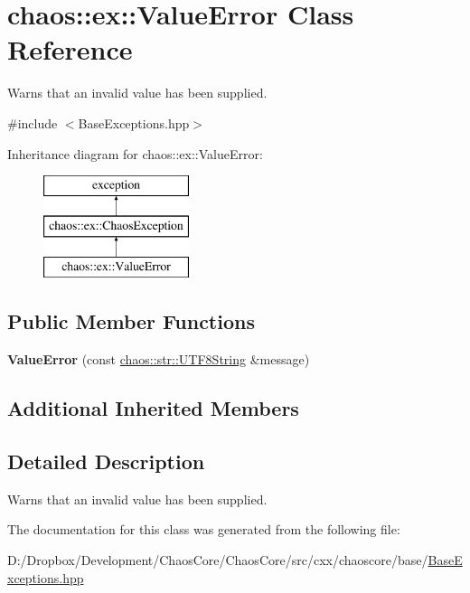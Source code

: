 \hypertarget{classchaos_1_1ex_1_1_value_error}{}\section{chaos\+:\+:ex\+:\+:Value\+Error Class Reference}
\label{classchaos_1_1ex_1_1_value_error}


Warns that an invalid value has been supplied.  




{\ttfamily \#include $<$Base\+Exceptions.\+hpp$>$}

Inheritance diagram for chaos\+:\+:ex\+:\+:Value\+Error\+:\begin{figure}[H]
\begin{center}
\leavevmode
\includegraphics[height=3.000000cm]{classchaos_1_1ex_1_1_value_error}
\end{center}
\end{figure}
\subsection*{Public Member Functions}
\begin{DoxyCompactItemize}
\item 
\hypertarget{classchaos_1_1ex_1_1_value_error_ad7c90b7ae603eec76908add85d311633}{}{\bfseries Value\+Error} (const \hyperlink{classchaos_1_1str_1_1_u_t_f8_string}{chaos\+::str\+::\+U\+T\+F8\+String} \&message)\label{classchaos_1_1ex_1_1_value_error_ad7c90b7ae603eec76908add85d311633}

\end{DoxyCompactItemize}
\subsection*{Additional Inherited Members}


\subsection{Detailed Description}
Warns that an invalid value has been supplied. 

The documentation for this class was generated from the following file\+:\begin{DoxyCompactItemize}
\item 
D\+:/\+Dropbox/\+Development/\+Chaos\+Core/\+Chaos\+Core/src/cxx/chaoscore/base/\hyperlink{_base_exceptions_8hpp}{Base\+Exceptions.\+hpp}\end{DoxyCompactItemize}
